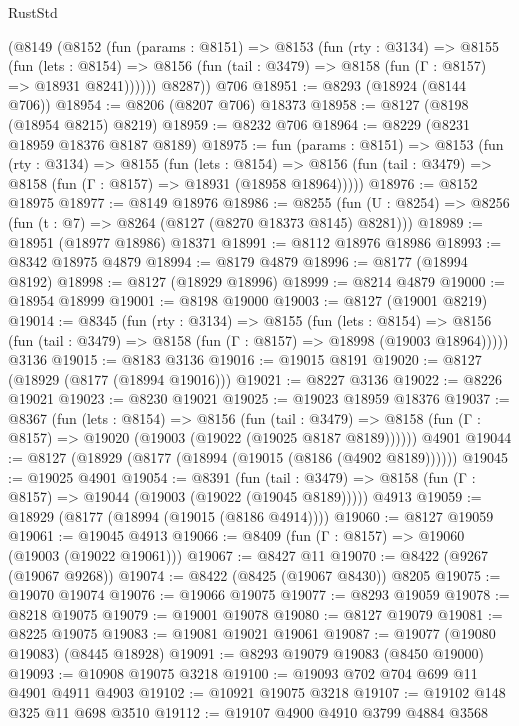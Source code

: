 \begin{lexlean}{RustStd}
\begin{coremodule}
      (@8149
        (@8152
          (fun (params : @8151) =>
          @8153
            (fun (rty : @3134) =>
            @8155
              (fun (lets : @8154) =>
              @8156 (fun (tail : @3479) => @8158 (fun (Γ : @8157) => @18931 @8241))))))
        @8287))
    @706
@18951 := @8293 (@18924 (@8144 @706))
@18954 := @8206 (@8207 @706) @18373
@18958 := @8127 (@8198 (@18954 @8215) @8219)
@18959 := @8232 @706
@18964 := @8229 (@8231 @18959 @18376 @8187 @8189)
@18975 := fun (params : @8151) =>
  @8153
    (fun (rty : @3134) =>
    @8155
      (fun (lets : @8154) =>
      @8156 (fun (tail : @3479) => @8158 (fun (Γ : @8157) => @18931 (@18958 @18964)))))
@18976 := @8152 @18975
@18977 := @8149 @18976
@18986 := @8255
    (fun (U : @8254) => @8256 (fun (t : @7) => @8264 (@8127 (@8270 @18373 @8145) @8281)))
@18989 := @18951 (@18977 @18986) @18371
@18991 := @8112 @18976 @18986
@18993 := @8342 @18975 @4879
@18994 := @8179 @4879
@18996 := @8177 (@18994 @8192)
@18998 := @8127 (@18929 @18996)
@18999 := @8214 @4879
@19000 := @18954 @18999
@19001 := @8198 @19000
@19003 := @8127 (@19001 @8219)
@19014 := @8345
    (fun (rty : @3134) =>
    @8155
      (fun (lets : @8154) =>
      @8156 (fun (tail : @3479) => @8158 (fun (Γ : @8157) => @18998 (@19003 @18964)))))
    @3136
@19015 := @8183 @3136
@19016 := @19015 @8191
@19020 := @8127 (@18929 (@8177 (@18994 @19016)))
@19021 := @8227 @3136
@19022 := @8226 @19021
@19023 := @8230 @19021
@19025 := @19023 @18959 @18376
@19037 := @8367
    (fun (lets : @8154) =>
    @8156
      (fun (tail : @3479) =>
      @8158 (fun (Γ : @8157) => @19020 (@19003 (@19022 (@19025 @8187 @8189))))))
    @4901
@19044 := @8127 (@18929 (@8177 (@18994 (@19015 (@8186 (@4902 @8189))))))
@19045 := @19025 @4901
@19054 := @8391
    (fun (tail : @3479) => @8158 (fun (Γ : @8157) => @19044 (@19003 (@19022 (@19045 @8189)))))
    @4913
@19059 := @18929 (@8177 (@18994 (@19015 (@8186 @4914))))
@19060 := @8127 @19059
@19061 := @19045 @4913
@19066 := @8409 (fun (Γ : @8157) => @19060 (@19003 (@19022 @19061)))
@19067 := @8427 @11
@19070 := @8422 (@9267 (@19067 @9268))
@19074 := @8422 (@8425 (@19067 @8430)) @8205
@19075 := @19070 @19074
@19076 := @19066 @19075
@19077 := @8293 @19059
@19078 := @8218 @19075
@19079 := @19001 @19078
@19080 := @8127 @19079
@19081 := @8225 @19075
@19083 := @19081 @19021 @19061
@19087 := @19077 (@19080 @19083) (@8445 @18928)
@19091 := @8293 @19079 @19083 (@8450 @19000)
@19093 := @10908 @19075 @3218
@19100 := @19093 @702 @704 @699 @11 @4901 @4911 @4903
@19102 := @10921 @19075 @3218
@19107 := @19102 @148 @325 @11 @698 @3510
@19112 := @19107 @4900 @4910 @3799 @4884 @3568

\end{coremodule}
\end{lexlean}
